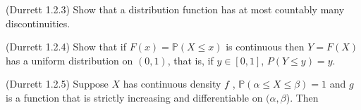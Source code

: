 \documentclass[12pt]{gradescopeexam}
\renewcommand\P{\mathbb{P}}
\begin{document}
\begin{questions}
\begin{question}
\begin{parts}
\begin{solutionorbox}[3in]
      \end{solutionorbox}
    \end{parts}
  \end{question}

  \begin{question}
    (Durrett 1.2.3)
    Show that a distribution function has at most countably many
    discontinuities.
    \begin{prooforbox}[6in]

    \end{prooforbox}
  \end{question}
  \begin{question}
    (Durrett 1.2.4) Show that if $F (x) = \P (X \le x)$ is continuous
    then $Y = F (X)$ has a uniform distribution on $(0,1)$, that is,
    if $y \in [0, 1]$, $P (Y \le y) = y$.
  \end{question}

  \begin{question}
    (Durrett 1.2.5) Suppose $X$ has continuous density $f$ ,
    $\P (\alpha \le X \le \beta) = 1$ and $g$ is a function that is
    strictly increasing and differentiable on $(\alpha, \beta$).  Then
\end{question}
\end{questions}
\end{document}

